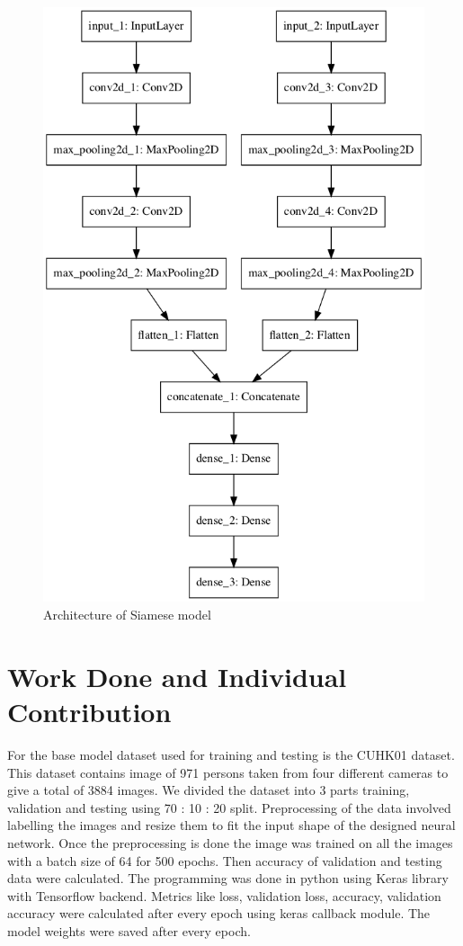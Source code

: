 \documentclass{article}[12pt,a4paper]
\begin{document}
\begin{figure}\hspace{6em}
\includegraphics[scale=0.5]{siamese}
\caption{Architecture of Siamese model}
\centering
\end{figure}
\newpage

\section{Work Done and Individual Contribution}
For the base model dataset used for training and testing is the CUHK01 dataset. This dataset contains image of 971 persons taken from four different cameras to give a total of 3884 images. We divided the dataset into 3 parts training, validation and testing using 70 : 10 : 20 split. 
Preprocessing of the data involved labelling the images and resize them to fit the input shape of the designed neural network. Once the preprocessing is done the image was trained on all the images with a batch size of 64 for 500 epochs. Then accuracy of validation and testing data were calculated. The programming was done in python using Keras library with Tensorflow backend. Metrics like loss, validation loss,  accuracy, validation accuracy were calculated after every epoch using keras callback module. The model weights were saved after every epoch.
\end{document}
